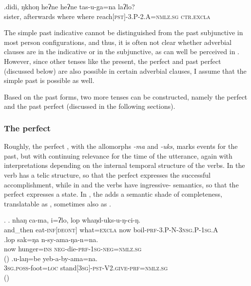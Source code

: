 \exg.didi,        ŋkhoŋ    heʔne heʔne tas-u-ga=na                    laʔlo?\\
sister, afterwards where where reach{\scshape [pst]-3.P-2.A=nmlz.sg} {\scshape ctr.excla}\\
  

The simple past indicative cannot be distinguished from the past subjunctive in most person configurations, and thus, it is often not clear whether adverbial clauses are in the indicative or in the subjunctive, as can well be perceived in \LLast. However, since other tenses like the present, the perfect and past perfect (discussed below) are also possible in certain adverbial clauses, I assume that the simple past is possible as well. 

Based on the past forms, two more tenses can be constructed, namely the perfect and the past perfect (discussed in the following sections). 

\subsubsection{The perfect}\label{prf}

Roughly, the perfect , with the allomorphs \emph{-ma} and \emph{-uks}, marks events for the past, but with continuing relevance for  the time of the utterance, again with interpretations depending on the internal temporal structure of the verbs. In \Next[a] the verb has a telic structure, so that the perfect expresses the successful accomplishment, while in \Next[b] and \Next[c] the verbs have ingressive- semantics, so that the perfect expresses a state. In \Next[c], the   adds a semantic shade of completeness, translatable as , sometimes also as .

\ex. \ag. nhaŋ    ca-ma,     i=ʔlo,   lop whaŋd-uks-u-ŋ-ci-ŋ.\\
		and\_then eat{\scshape -inf[deont]} what{\scshape =excla} now boil{\scshape -prf-3.P-N-3nsg.P-1sg.A}\\
		 
		\bg.lop sak=ŋa n-sy-ama-ŋa-n=na.\\
now hunger{\scshape =ins} {\scshape neg-}die{\scshape -prf-1sg-neg=nmlz.sg}\\
		 ()
	\bg.u-laŋ=be yeb-a-by-ama=na.\\
	{\scshape 3sg.poss-}foot{\scshape =loc} stand{\scshape [3sg]-pst-V2.give-prf=nmlz.sg}\\
	 ()
	
